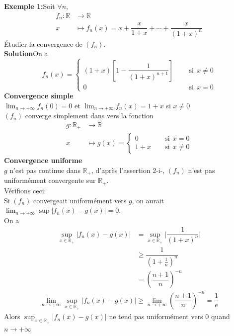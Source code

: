 \documentclass[11pt, a4paper]{book}
\begin{document}
\textbf{Exemple 1:}\quad Soit $\forall n,$ 
\begin{align*}
f_n:\mathbb{R} & \longrightarrow \mathbb{R}\\
x & \longmapsto f_n(x)=x+\dfrac{x}{1+x}+\cdots+\dfrac{x}{(1+x)^n}
\end{align*}
\'Etudier la convergence de $(f_n)$.\\
\textbf{Solution}\quad On a $$f_n(x)=
\begin{cases}(1+x)\left[1-\dfrac{1}{(1+x)^{n+1}}\right] &\quad~~\text{si} ~~x\neq 0\\ 0 &\quad~~\text{si}~~x=0 \end{cases}$$
\textbf{Convergence simple}\\
${\displaystyle \lim_{n\rightarrow+\infty}f_n(0)=0}$ et ${\displaystyle \lim_{n\rightarrow+\infty}f_n(x)=1+x}$ si $x\neq0$\\
$(f_n)$  converge simplement dans vers la fonction 
\begin{align*}
g:\mathbb{R_+}&\longrightarrow\mathbb{R}\\ x&\longmapsto g(x)=\begin{cases} 0&\quad\text{si}~~x=0\\1+x~&\quad\text{si}~~x\neq 0 \end{cases}
\end{align*}
\textbf{Convergence uniforme}\\
$g$ n'est pas continue dans $\mathbb{R_+}$, d'apr\`es l'assertion 2-i-, $(f_n)$ n'est pas uniform\'ement convergente sur $\mathbb{R_+}.$\\
V\'erifions ceci:\\
Si $(f_n)$ convergeait uniform\'ement vers $g$, on aurait ${\displaystyle \lim_{n\rightarrow+\infty}\sup|f_n(x)-g(x)|=0.}$\\
 On a 
\begin{align*}
\sup_{x\in \mathbb{R_+}}|f_n(x)-g(x)|&=\sup_{x\in \mathbb{R_+}}\Big|\dfrac{1}{(1+x)^n}\Big|\\ &\geq \dfrac{1}{(1+\frac{1}{n})^n}\\&=\left(\dfrac{n+1}{n}\right)^{-n}
\end{align*}
\begin{align*}
\lim_{n\rightarrow+\infty}\sup_{x\in\mathbb{R}_+}|f_n(x)-g(x)|\geq\lim_{n\rightarrow+\infty}\left(\dfrac{n+1}{n}\right)^{-n}=\dfrac{1}{e}
\end{align*}
Alors ${\displaystyle\sup_{x\in\mathbb{R_+}}|f_n(x)-g(x)|}$ ne tend pas uniform\'ement vers $0$ quand $n\rightarrow+\infty$\\
\end{document}
